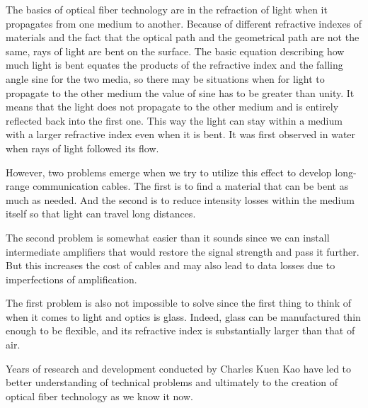\documentclass[a4paper, 12pt]{article}
\begin{document}
The basics of optical fiber technology are in the refraction of light 
when it propagates from one medium to another. Because of different 
refractive indexes of materials and the fact that the optical path and 
the geometrical path are not the same, rays of light are bent on the 
surface. The basic equation describing how much light is bent equates 
the products of the refractive index and the falling angle sine for the 
two media, so there may be situations when for light to propagate to the 
other medium the value of sine has to be greater than unity. It means 
that the light does not propagate to the other medium and is entirely 
reflected back into the first one. This way the light can stay within 
a medium with a larger refractive index even when it is bent. It was 
first observed in water when rays of light followed its flow.

However, two problems emerge when we try to utilize this effect to 
develop long-range communication cables. The first is to find a material 
that can be bent as much as needed. And the second is to reduce 
intensity losses within the medium itself so that light can travel long 
distances.

The second problem is somewhat easier than it sounds since we can 
install intermediate amplifiers that would restore the signal strength 
and pass it further. But this increases the cost of cables and may also 
lead to data losses due to imperfections of amplification.

The first problem is also not impossible to solve since the first thing 
to think of when it comes to light and optics is glass. Indeed, glass 
can be manufactured thin enough to be flexible, and its refractive index 
is substantially larger than that of air.

Years of research and development conducted by Charles Kuen Kao have led 
to better understanding of technical problems and ultimately to the 
creation of optical fiber technology as we know it now.
\end{document}
